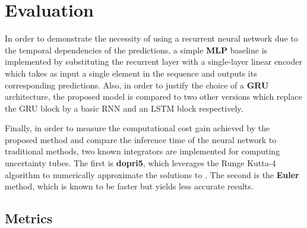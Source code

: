 \section{Evaluation}\label{sec:nn_eval}

In order to demonstrate the necessity of using a recurrent neural network due to the temporal dependencies of the predictions, a simple \textbf{MLP} baseline is implemented by substituting the recurrent layer with a single-layer linear encoder which takes as input a single element in the sequence and outputs its corresponding predictions.
Also, in order to justify the choice of a \textbf{GRU} architecture, the proposed model is compared to two other versions which replace the GRU block by a basic RNN \cite{cRNN} and an LSTM \cite{cLSTM} block respectively.

Finally, in order to measure the computational cost gain achieved by the proposed method and compare the inference time of the neural network to traditional methods, two known  integrators are implemented for computing uncertainty tubes.
The first is \textbf{dopri5}, which leverages the Runge Kutta-4 algorithm to numerically approximate the solutions to . 
The second is the \textbf{Euler} method, which is known to be faster but yields less accurate results.

\subsection{Metrics}\label{sec:metric}


